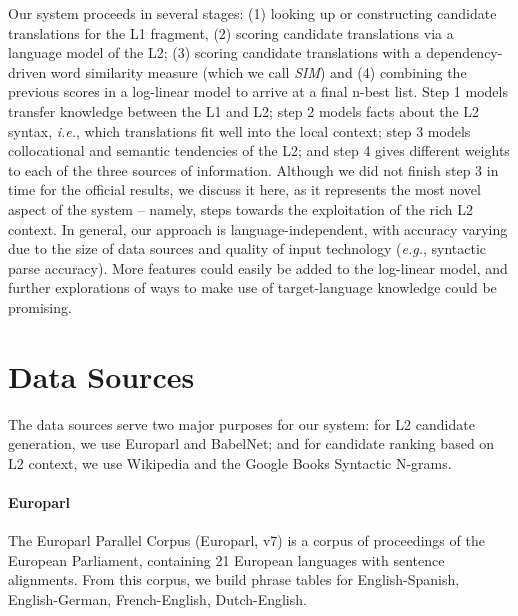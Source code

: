 \documentclass[11pt,a4paper]{article}
\begin{document}
Our system proceeds in several stages: (1) looking up or constructing candidate
translations for the L1 fragment, (2) scoring candidate translations via a
language model of the L2; (3) scoring candidate translations with a
dependency-driven word similarity measure \cite{lin:98} (which we call
\textit{SIM}) and (4) combining the previous scores in a log-linear model to
arrive at a final n-best list.  Step 1 models transfer knowledge between the L1
and L2; step 2 models facts about the L2 syntax, \emph{i.e.}, which
translations fit well into the local context; step 3 models collocational and
semantic tendencies of the L2; and step 4 gives different weights to each of
the three sources of information.  Although we did not finish step 3 in time
for the official results, we discuss it here, as it represents the most novel
aspect of the system -- namely, steps towards the exploitation of the rich L2
context. In general, our approach is language-independent, with accuracy
varying due to the size of data sources and quality of input technology
(\emph{e.g.}, syntactic parse accuracy). More features could easily be added to
the log-linear model, and further explorations of ways to make use of
target-language knowledge could be promising.

\section{Data Sources}
The data sources serve two major purposes for our system: for L2 candidate generation, we use Europarl and BabelNet; and for candidate ranking based on L2 context, we use Wikipedia and the Google Books Syntactic N-grams. 

\paragraph{Europarl}  %
The Europarl Parallel Corpus (Europarl, v7) \cite{koehn:05} is a corpus of proceedings of the European Parliament, containing 21 European languages with sentence alignments.
From this corpus, we build phrase tables for English-Spanish, English-German, French-English, Dutch-English.
\end{document}
